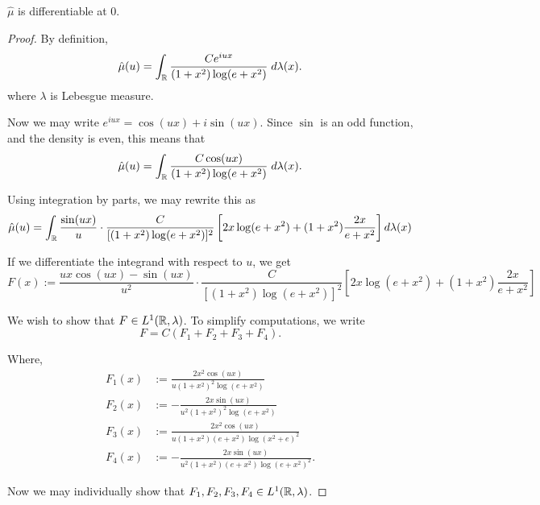 \documentclass{unswmaths}
\begin{document}
\begin{lemma}
    $\hat{\mu}$ is differentiable at $0$.
\end{lemma}
\begin{proof}
    By definition,
    \begin{equation*}
        \hat{\mu}(u) = \int_{\mathbb{R}} \frac{Ce^{iux}}{(1+x^2)\log(e+x^2)}\;d\lambda(x).
    \end{equation*}
    where $\lambda$ is Lebesgue measure.
    
    Now we may write $e^{iux} = \cos(ux)+i\sin(ux)$. Since $\sin$
    is an odd function, and the density is even, this means that
    \begin{equation*}
        \hat{\mu}(u) = \int_{\mathbb{R}} \frac{C\cos(ux)}{(1+x^2)\log(e+x^2)}\;d\lambda(x).
    \end{equation*}
    
    Using integration by parts, we may rewrite this as
    \begin{equation*}
        \hat{\mu}(u) = \int_{\mathbb{R}} \frac{\sin(ux)}{u}\cdot\frac{C}{[(1+x^2)\log(e+x^2)]^2}\left[2x\log(e+x^2)+(1+x^2)\frac{2x}{e+x^2}\right]d\lambda(x)
    \end{equation*}
    
    If we differentiate the integrand with respect to $u$, we get
    \begin{equation*}
        F(x) := \frac{ux\cos(ux)-\sin(ux)}{u^2}\cdot \frac{C}{[(1+x^2)\log(e+x^2)]^2}\left[2x\log(e+x^2)+(1+x^2)\frac{2x}{e+x^2}\right]
    \end{equation*}
    
    We wish to show that $F \in L^1(\mathbb{R},\lambda)$. To simplify computations, we write
    \begin{equation*}
        F = C(F_1+F_2+F_3+F_4).
    \end{equation*}
    
    Where,
    \begin{align*}
        F_1(x) &:= \frac{2x^2\cos(ux)}{u(1+x^2)^2\log(e+x^2)}\\
        F_2(x) &:= -\frac{2x\sin(ux)}{u^2(1+x^2)^2\log(e+x^2)}\\
        F_3(x) &:= \frac{2x^2\cos(ux)}{u(1+x^2)(e+x^2)\log(x^2+e)^2}\\
        F_4(x) &:= -\frac{2x\sin(ux)}{u^2(1+x^2)(e+x^2)\log(e+x^2)^2}.
    \end{align*}
    
    Now we may individually show that $F_1,F_2,F_3,F_4 \in L^1(\mathbb{R},\lambda)$.
    

\end{proof}
\end{document}
